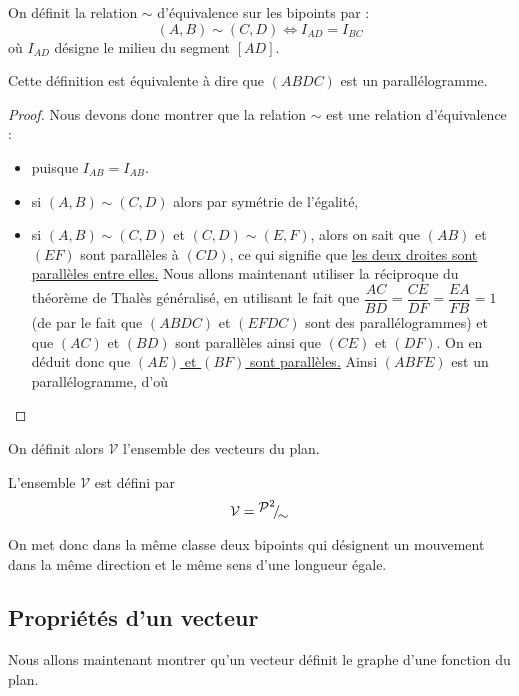 \begin{defi}[Equipollence]
    On définit la relation $\sim$ d'équivalence sur les bipoints par :
    $$(A,B)\sim (C,D) \iff I_{AD} = I_{BC}$$ où $I_{AD}$ désigne le milieu du segment $[AD]$.
    
    Cette définition est équivalente à dire que $(ABDC)$ est un parallélogramme.
\end{defi}
\begin{proof}
    Nous devons donc montrer que la relation $\sim$ est une relation d'équivalence :
    \begin{itemize}[label=$\bullet$]
        \item {} puisque $I_{AB}=I_{AB}$.
        \item si $(A,B)\sim(C,D)$ alors par symétrie de l'égalité, 
        \item si $(A,B)\sim(C,D)$ et $(C,D)\sim(E,F)$, alors on sait que $(AB)$ et $(EF)$ sont parallèles à $(CD)$, ce qui signifie que \underline{les deux droites sont parallèles entre elles.} Nous allons maintenant utiliser la réciproque du théorème de Thalès généralisé, en utilisant le fait que $\dfrac{AC}{BD}=\dfrac{CE}{DF}=\dfrac{EA}{FB}=1$ (de par le fait que $(ABDC)$ et $(EFDC)$ sont des parallélogrammes) et que $(AC)$ et $(BD)$ sont parallèles ainsi que $(CE)$ et $(DF)$. On en déduit donc que \underline{$(AE)$ et $(BF)$ sont parallèles.} Ainsi $(ABFE)$ est un parallélogramme, d'où 
    \end{itemize}
\end{proof}


On définit alors $\mathcal V$ l'ensemble des vecteurs du plan.

\begin{defi}[Vecteur]
    L'ensemble $\mathcal V$ est défini par $$\mathcal V = \quot{\mathcal P^2}{\sim}$$
\end{defi}

On met donc dans la même classe deux bipoints qui désignent un mouvement dans la même direction et le même sens d'une longueur égale.

\subsection{Propriétés d'un vecteur}

Nous allons maintenant montrer qu'un vecteur définit le graphe d'une fonction du plan.

